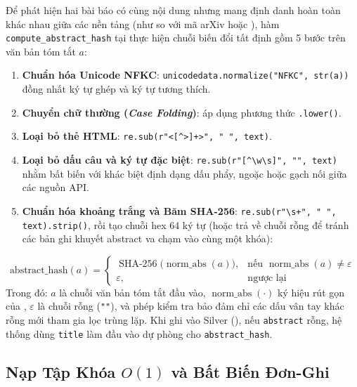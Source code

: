 Để phát hiện hai bài báo có cùng nội dung nhưng mang định danh hoàn toàn khác nhau giữa các nền tảng (như  so với mã arXiv hoặc ), hàm \texttt{compute\_abstract\_hash} tại  thực hiện chuỗi biến đổi tất định gồm 5 bước trên văn bản tóm tắt $a$:
\begin{enumerate}[label=\textbf{\arabic*.}]
  \item \textbf{Chuẩn hóa Unicode NFKC}: \texttt{unicodedata.normalize("NFKC", str(a))} đồng nhất ký tự ghép và ký tự tương thích.
  \item \textbf{Chuyển chữ thường (\textit{Case Folding})}: áp dụng phương thức \texttt{.lower()}.
  \item \textbf{Loại bỏ thẻ HTML}: \texttt{re.sub(r"<[\^{}>]+>", " ", text)}.
  \item \textbf{Loại bỏ dấu câu và ký tự đặc biệt}: \texttt{re.sub(r"[\^{}\textbackslash w\textbackslash s]", "", text)} nhằm bất biến với khác biệt định dạng dấu phẩy, ngoặc hoặc gạch nối giữa các nguồn API.
  \item \textbf{Chuẩn hóa khoảng trắng và Băm SHA-256}: \texttt{re.sub(r"\textbackslash s+", " ", text).strip()}, rồi tạo chuỗi hex 64 ký tự (hoặc trả về chuỗi rỗng để tránh các bản ghi khuyết abstract va chạm vào cùng một khóa):
\end{enumerate}
\begin{equation}
  \text{abstract\_hash}(a) =
  \begin{cases}
    \operatorname{SHA-256}\!\bigl(\operatorname{norm\_abs}(a)\bigr), & \text{nếu } \operatorname{norm\_abs}(a) \neq \varepsilon \\
    \varepsilon, & \text{ngược lại}
  \end{cases}
  \label{eq:ch2_abstract_hash}
\end{equation}
\noindent Trong đó: $a$ là chuỗi văn bản tóm tắt đầu vào, $\operatorname{norm\_abs}(\cdot)$ ký hiệu rút gọn của , $\varepsilon$ là chuỗi rỗng (\texttt{""}), và phép kiểm tra  bảo đảm chỉ các dấu vân tay khác rỗng mới tham gia lọc trùng lặp. Khi ghi vào Silver (), nếu \texttt{abstract} rỗng, hệ thống dùng \texttt{title} làm đầu vào dự phòng cho \texttt{abstract\_hash}.

\subsection{Nạp Tập Khóa \texorpdfstring{$O(1)$}{O(1)} và Bất Biến Đơn-Ghi}
\label{sec:ch2_single_writer}

